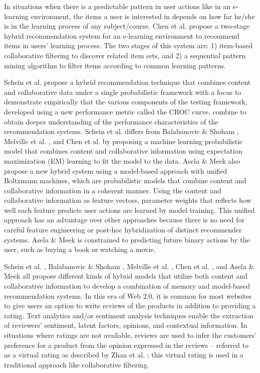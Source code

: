 \documentclass[12pt]{article}
\begin{document}
In situations when there is a predictable pattern in user actions like in an e-learning environment, the items a user is interested in depends on how far he/she is in the learning process of any subject/course. Chen et al. \cite{chen} propose a two-stage hybrid recommendation system for an e-learning environment to recommend items in users' learning process. The two stages of this system are: 1) item-based collaborative filtering to discover related item sets, and 2) a sequential pattern mining algorithm to filter items according to common learning patterns. 

Schein et al. \cite{schein} propose a hybrid recommendation technique that combines content and collaborative data under a single probabilistic framework with a focus to demonstrate empirically that the various components of the testing framework, developed using a new performance metric called the CROC curve, combine to obtain deeper understanding of the performance characteristics of the recommendation systems. Schein et al. \cite{schein} differs from Balabanovic \& Shoham \cite{balabanovic}, Melville et al. \cite{melville}, and Chen et al. \cite{chen} by proposing a machine learning probabilistic model that combines content and collaborative information using expectation maximization (EM) learning to fit the model to the data. Asela \& Meek \cite{gunawardana} also propose a new hybrid system using a model-based approach with unified Boltzmann machines, which are probabilistic models that combine content and collaborative information in a coherent manner. Using the content and collaborative information as feature vectors, parameter weights that reflects how well each feature predicts user actions are learned by model training. This unified approach has an advantage over other approaches because there is no need for careful feature engineering or post-hoc hybridization of distinct recommender systems. Asela \& Meek \cite{gunawardana} is constrained to predicting future binary actions by the user, such as buying a book or watching a movie. 

Schein et al. \cite{schein}, Balabanovic \& Shoham \cite{balabanovic}, Melville et al. \cite{melville}, Chen et al. \cite{chen}, and Asela \& Meek \cite{gunawardana} all propose different kinds of hybrid models that utilize both content and collaborative information to develop a combination of memory and model-based recommendation systems. In this era of Web 2.0, it is common for most websites to give users an option to write reviews of the products in addition to providing a rating. Text analytics and/or sentiment analysis techniques enable the extraction of reviewers' sentiment, latent factors, opinions, and contextual information. In situations where ratings are not available, reviews are used to infer the customers' preference for a product from the opinion expressed in the reviews -- referred to as a virtual rating as described by Zhan et al. \cite{zhang-narayan}; this virtual rating is used in a traditional approach like collaborative filtering. 
\end{document}
